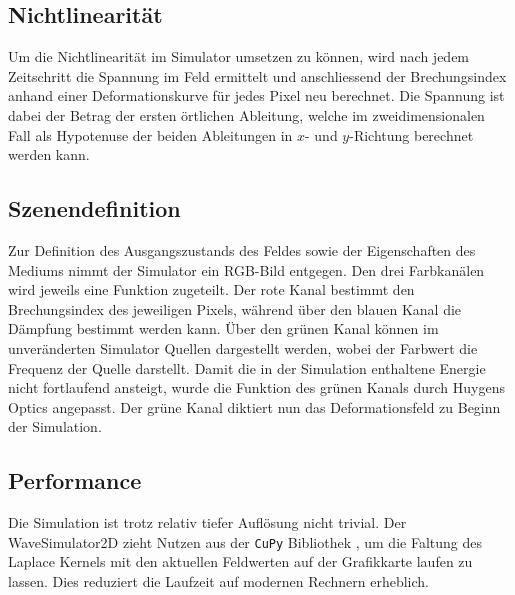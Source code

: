 \subsection{Nichtlinearität}
Um die Nichtlinearität im Simulator umsetzen zu können, wird nach jedem Zeitschritt die Spannung im Feld ermittelt und anschliessend der Brechungsindex anhand einer Deformationskurve für jedes Pixel neu berechnet.
Die Spannung ist dabei der Betrag der ersten örtlichen Ableitung, welche im zweidimensionalen Fall als Hypotenuse der beiden Ableitungen in $x$- und $y$-Richtung berechnet werden kann.

\subsection{Szenendefinition}
Zur Definition des Ausgangszustands des Feldes sowie der Eigenschaften des Mediums nimmt der Simulator ein RGB-Bild entgegen.
Den drei Farbkanälen wird jeweils eine Funktion zugeteilt.
Der rote Kanal bestimmt den Brechungsindex des jeweiligen Pixels, während über den blauen Kanal die Dämpfung bestimmt werden kann.
Über den grünen Kanal können im unveränderten Simulator Quellen dargestellt werden, wobei der Farbwert die Frequenz der Quelle darstellt.
Damit die in der Simulation enthaltene Energie nicht fortlaufend ansteigt, wurde die Funktion des grünen Kanals durch Huygens Optics angepasst.
Der grüne Kanal diktiert nun das Deformationsfeld zu Beginn der Simulation.

\subsection{Performance}
Die Simulation ist trotz relativ tiefer Auflösung nicht trivial. 
Der WaveSimulator2D zieht Nutzen aus der \texttt{CuPy} Bibliothek
\cite{particles:cupy}, um die Faltung des Laplace Kernels mit den
aktuellen Feldwerten auf der Grafikkarte laufen zu lassen.
Dies reduziert die Laufzeit auf modernen Rechnern erheblich.
